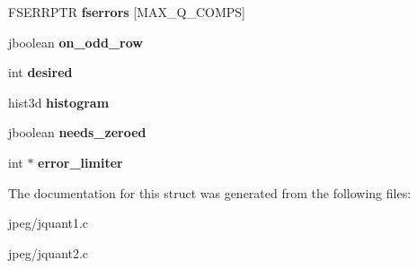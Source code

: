 \begin{DoxyCompactItemize}
\item 
F\+S\+E\+R\+R\+P\+TR {\bfseries fserrors} \mbox{[}M\+A\+X\+\_\+\+Q\+\_\+\+C\+O\+M\+PS\mbox{]}\hypertarget{structmy__cquantizer_a486b351b769e8cdfc832dc33309c7069}{}\label{structmy__cquantizer_a486b351b769e8cdfc832dc33309c7069}

\item 
jboolean {\bfseries on\+\_\+odd\+\_\+row}\hypertarget{structmy__cquantizer_aabf8dc99a9afcd433268fdb6550df63f}{}\label{structmy__cquantizer_aabf8dc99a9afcd433268fdb6550df63f}

\item 
int {\bfseries desired}\hypertarget{structmy__cquantizer_aa960fa399af744fcdbf9c07ab9bd956e}{}\label{structmy__cquantizer_aa960fa399af744fcdbf9c07ab9bd956e}

\item 
hist3d {\bfseries histogram}\hypertarget{structmy__cquantizer_a108a22411249dc52d196fa5a1ee50173}{}\label{structmy__cquantizer_a108a22411249dc52d196fa5a1ee50173}

\item 
jboolean {\bfseries needs\+\_\+zeroed}\hypertarget{structmy__cquantizer_a33d33cc03e99bf8128b9a225d81e1e85}{}\label{structmy__cquantizer_a33d33cc03e99bf8128b9a225d81e1e85}

\item 
int $\ast$ {\bfseries error\+\_\+limiter}\hypertarget{structmy__cquantizer_a2af4df34ba2e1a9081f0dc3a661066e7}{}\label{structmy__cquantizer_a2af4df34ba2e1a9081f0dc3a661066e7}

\end{DoxyCompactItemize}


The documentation for this struct was generated from the following files\+:\begin{DoxyCompactItemize}
\item 
jpeg/jquant1.\+c\item 
jpeg/jquant2.\+c\end{DoxyCompactItemize}
